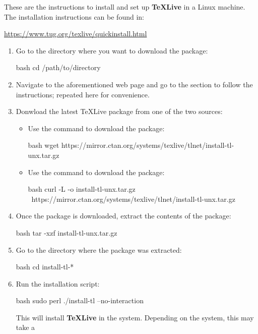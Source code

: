 These are the instructions to install and set up \textbf{TeXLive} in a Linux machine. The
installation instructions can be found in:
\begin{center}
    \url{https://www.tug.org/texlive/quickinstall.html}
\end{center}
\begin{enumerate}
    \item Go to the directory where you want to download the package:
    \begin{mintedbox}{bash}
cd /path/to/directory
    \end{mintedbox}
    \item Navigate to the aforementioned web page and go to the 
    section to follow the instructions; repeated here for convenience.
    \item Donwload the latest TeXLive package from one of the two sources:
    \begin{itemize}
        \item Use the  command to download the package:
        \begin{mintedbox}{bash}
wget https://mirror.ctan.org/systems/texlive/tlnet/install-tl-unx.tar.gz
        \end{mintedbox}
        \item Use the  command to download the package:
        \begin{mintedbox}{bash}
curl -L -o install-tl-unx.tar.gz \
https://mirror.ctan.org/systems/texlive/tlnet/install-tl-unx.tar.gz
        \end{mintedbox}
    \end{itemize}
    \item Once the package is downloaded, extract the contents of the package:
    \begin{mintedbox}{bash}
tar -xzf install-tl-unx.tar.gz
    \end{mintedbox}
    \item Go to the directory where the package was extracted:
    \begin{mintedbox}{bash}
cd install-tl-*
    \end{mintedbox}
    \item Run the installation script:
    \begin{mintedbox}{bash}
sudo perl ./install-tl --no-interaction
    \end{mintedbox}
    This will install \textbf{TeXLive} in the system. Depending on the system, this may take a

\end{enumerate}
